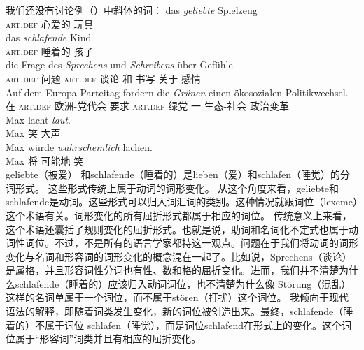 我们还没有讨论例（）中斜体的词：
\eal
\ex 
\gll das \emph{geliebte} Spielzeug\\
	 \textsc{art}.\textsc{def} 心爱的 玩具\\
\ex 
\gll das \emph{schlafende} Kind\\
	 \textsc{art}.\textsc{def} 睡着的 孩子\\
\ex 
\gll die Frage des \emph{Sprechens} und \emph{Schreibens} über Gefühle\\
	 \textsc{art}.\textsc{def} 问题 \textsc{art}.\textsc{def} 谈论 和 书写 关于 感情\\
\ex 
\gll Auf dem Europa-Parteitag fordern die \emph{Grünen} einen ökosozialen Politikwechsel.\\
	 在 \textsc{art}.\textsc{def} 欧洲-党代会 要求 \textsc{art}.\textsc{def} 绿党 一 生态-社会 政治变革\\
\ex\label{Wortart-adverbiales-Adjektiv} 
\gll Max lacht \emph{laut}.\\
	 Max 笑 大声\\
\ex\label{Wortart-Satzadverb-Adjektiv} 
\gll Max würde \emph{wahrscheinlich} lachen.\\
     Max  将 可能地 笑\\
\zl
geliebte（被爱） 和schlafende（睡着的）是lieben（爱）和schlafen（睡觉）的分词形式。
这些形式传统上属于动词的词形变化。
从这个角度来看，geliebte和schlafende是动词。这些形式可以归入词汇词的类别。这种情况就跟词位（lexeme）这个术语有关。词形变化的所有屈折形式都属于相应的词位。
传统意义上来看，这个术语还囊括了规则变化的屈折形式。也就是说，助词和名词化不定式也属于动词性词位。不过，不是所有的语言学家都持这一观点。问题在于我们将动词的词形变化与名词和形容词的词形变化的概念混在一起了。比如说，Sprechens（谈论）是属格，并且形容词性分词也有性、数和格的屈折变化。进而，我们并不清楚为什么schlafende（睡着的）应该归入动词词位，也不清楚为什么像 Störung（混乱）这样的名词单属于一个词位，而不属于stören（打扰）这个词位。
我倾向于现代语法的解释，即随着词类发生变化，新的词位被创造出来。最终，schlafende（睡着的）不属于词位 schlafen（睡觉），而是词位schlafend在形式上的变化。这个词位属于“形容词”词类并且有相应的屈折变化。
